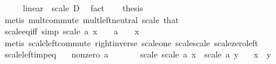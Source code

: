 \begin{isabellebody}
%
\isadelimproof
%
\endisadelimproof
%
\isatagproof
{}\isamarkupfalse%
\ {\isacharminus}{\kern0pt}\isanewline
\ \ \isamarkupfalse%
\ linear\ {\isachardoublequoteopen}{\isacharparenleft}{\kern0pt}{\isacharasterisk}{\kern0pt}{\isacharparenright}{\kern0pt}{\isachardoublequoteclose}\ scale\ D\ \isamarkupfalse%
\ fact\isanewline
\ \ \isamarkupfalse%
\ {\isacharquery}{\kern0pt}thesis\isanewline
\ \ \ \ \isamarkupfalse%
\ {\isacharparenleft}{\kern0pt}metis\ mult{\isachardot}{\kern0pt}commute\ mult{\isachardot}{\kern0pt}left{\isacharunderscore}{\kern0pt}neutral\ scale\ that{\isacharparenright}{\kern0pt}\isanewline
{}\isamarkupfalse%
%
\endisatagproof
{\isafoldproof}%
%
\isadelimproof
\isanewline
%
\endisadelimproof
\isanewline
{}\isamarkupfalse%
\ scale{\isacharunderscore}{\kern0pt}eq{\isacharunderscore}{\kern0pt}{}{\isacharunderscore}{\kern0pt}iff\ {\isacharbrackleft}{\kern0pt}simp{\isacharbrackright}{\kern0pt}{\isacharcolon}{\kern0pt}\ {\isachardoublequoteopen}scale\ a\ x\ {\isacharequal}{\kern0pt}\ {}\ {\isasymlongleftrightarrow}\ a\ {\isacharequal}{\kern0pt}\ {}\ {\isasymor}\ x\ {\isacharequal}{\kern0pt}\ {}{\isachardoublequoteclose}\isanewline
%
\isadelimproof
\ \ %
\endisadelimproof
%
\isatagproof
{}\isamarkupfalse%
\ {\isacharparenleft}{\kern0pt}metis\ scale{\isacharunderscore}{\kern0pt}left{\isacharunderscore}{\kern0pt}commute\ right{\isacharunderscore}{\kern0pt}inverse\ scale{\isacharunderscore}{\kern0pt}one\ scale{\isacharunderscore}{\kern0pt}scale\ scale{\isacharunderscore}{\kern0pt}zero{\isacharunderscore}{\kern0pt}left{\isacharparenright}{\kern0pt}%
\endisatagproof
{\isafoldproof}%
%
\isadelimproof
\isanewline
%
\endisadelimproof
\isanewline
{}\isamarkupfalse%
\ scale{\isacharunderscore}{\kern0pt}left{\isacharunderscore}{\kern0pt}imp{\isacharunderscore}{\kern0pt}eq{\isacharcolon}{\kern0pt}\isanewline
\ \ \ nonzero{\isacharcolon}{\kern0pt}\ {\isachardoublequoteopen}a\ {\isasymnoteq}\ {}{\isachardoublequoteclose}\isanewline
\ \ \ \ \ scale{\isacharcolon}{\kern0pt}\ {\isachardoublequoteopen}scale\ a\ x\ {\isacharequal}{\kern0pt}\ scale\ a\ y{\isachardoublequoteclose}\isanewline
\ \ \ {\isachardoublequoteopen}x\ {\isacharequal}{\kern0pt}\ y{\isachardoublequoteclose}\isanewline
%
\isadelimproof
%
\endisadelimproof
%
\isatagproof
{}\isamarkupfalse%
\ {\isacharminus}{\kern0pt}\isanewline

\end{isabellebody}
